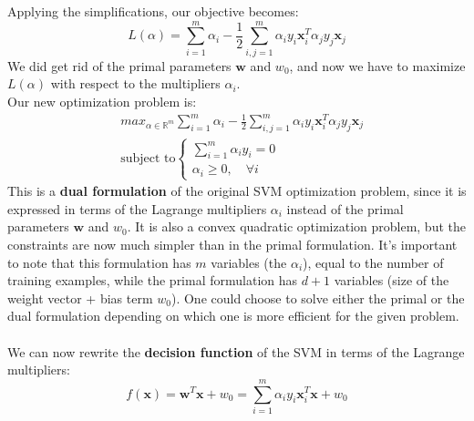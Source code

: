Applying the simplifications, our objective becomes:
\begin{equation}
    L(\alpha) = \sum_{i=1}^{m} \alpha_i 
    -\frac{1}{2} \sum_{i,j=1}^{m} \alpha_i y_i \mathbf{x}_i^{T} \alpha_j y_j \mathbf{x}_j
\end{equation}
We did get rid of the primal parameters $\boldsymbol{w}$ and $w_0$, and now we have to maximize $L(\alpha)$ with respect to the multipliers $\alpha_i$.
\\Our new optimization problem is:
\begin{equation}
    \label{eq:svm_dual}
    \begin{aligned}
        & max_{\alpha \in \mathbb{R}^m } \sum_{i=1}^{m} \alpha_i 
        - \frac{1}{2} \sum_{i,j=1}^{m} \alpha_i y_i \mathbf{x}_i^{T} \alpha_j y_j \mathbf{x}_j\\
        & \text{subject to} \begin{cases}
            \sum_{i=1}^{m} \alpha_i y_i = 0 \\
            \alpha_i \geq 0, \quad \forall i
        \end{cases}
    \end{aligned}
\end{equation}
This is a \textbf{dual formulation} of the original SVM optimization problem, since it is expressed in terms of the Lagrange 
multipliers $\alpha_i$ instead of the primal parameters $\boldsymbol{w}$ and $w_0$. It is also a convex quadratic optimization problem, 
but the constraints are now much simpler than in the primal formulation.
It's important to note that this formulation has $m$ variables (the $\alpha_i$), equal to the number of training examples,
while the primal formulation has $d + 1$ variables (size of the weight vector + bias term $w_0$). One could
choose to solve either the primal or the dual formulation depending on which one is more efficient for the given problem.
\\\\We can now rewrite the \textbf{decision function} of the SVM in terms of the Lagrange multipliers:
\begin{equation}
    f(\boldsymbol{x}) = \boldsymbol{w}^T \boldsymbol{x} + w_0 = \sum_{i=1}^{m} \alpha_i y_i \mathbf{x}_i^{T} \mathbf{x} + w_0
\end{equation}
